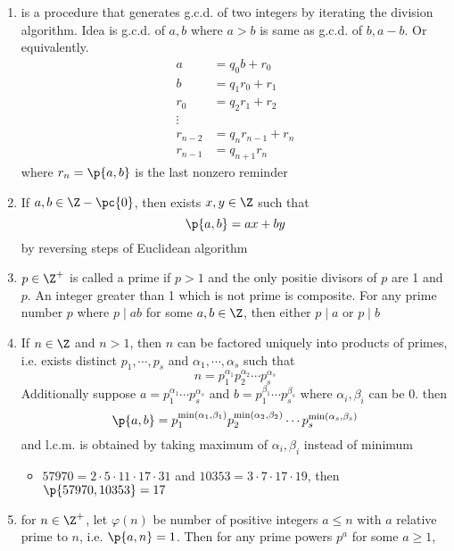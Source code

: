 \documentclass[11pt]{article}
\begin{document}
\begin{definition*}
\begin{enumerate}
        \item {} is a procedure that generates g.c.d. of two integers by iterating the division algorithm. Idea is g.c.d. of $a,b$ where $a>b$ is same as g.c.d. of $b,a-b$. Or equivalently. 
        \begin{align*}
            a &= q_0 b + r_0 \\
            b &= q_1 r_0 + r_1 \\
            r_0 &= q_2 r_1 + r_2 \\
            \vdots \\
            r_{n-2} &= q_n r_{n-1} + r_n \\
            r_{n-1} &= q_{n+1} r_n
        \end{align*}
        where $r_n = \p{a,b}$ is the last nonzero reminder
        \item {} If $a,b\in \Z -\pc{0}$, then exists $x,y\in\Z$ such that 
        \[
            \p{a,b} = ax + by    
        \]
        by reversing steps of Euclidean algorithm
        \item {} $p\in \Z^+$ is called a prime if $p>1$ and the only positie divisors of $p$ are 1 and $p$. An integer greater than 1 which is not prime is composite. For any prime number $p$ where $p\mid ab$ for some $a,b\in\Z$, then either $p\mid a$ or $p \mid b$
        \item {} If $n\in \Z$ and $n>1$, then $n$ can be factored uniquely into products of primes, i.e. exists distinct $p_1,\cdots,p_s$ and $\alpha_1,\cdots, \alpha_s$ such that 
        \[
            n = p_1^{\alpha_1} p_2^{\alpha_2} \cdots p_s^{\alpha_s}
        \]
        Additionally suppose $a = p_1^{\alpha_1} \cdots p_s^{\alpha_s}$ and $b = p_1^{\beta_1} \cdots p_s^{\beta_s}$ where $\alpha_i,\beta_i$ can be 0. then 
        \[
            \p{a,b} = p_1^{\min(\alpha_1,\beta_1)} p_2^{\min(\alpha_2,\beta_2)} \cdots p_s^{\min(\alpha_s,\beta_s)}
        \]
        and l.c.m. is obtained by taking maximum of $\alpha_i,\beta_i$ instead of minimum
        \begin{itemize}
            \item $57970 = 2\cdot 5 \cdot 11 \cdot 17 \cdot 31$ and $10353 = 3\cdot 7 \cdot 17 \cdot 19$, then $\p{57970, 10353} = 17$
        \end{itemize}
        \item {} for $n\in \Z^+$, let $\varphi(n)$ be number of positive integers $a\leq n$ with $a$ relative prime to $n$, i.e. $\p{a,n} = 1$. Then for any prime powers $p^a$ for some $a\geq 1$,

\end{enumerate}
\end{definition*}
\end{document}
